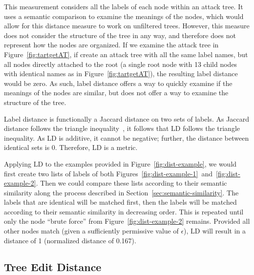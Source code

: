 This measurement considers all the labels of each node within an attack tree. It uses a semantic comparison to examine the meanings of the nodes, which would allow for this distance measure to work on unfiltered trees. However, this measure does not consider the structure of the tree in any way, and therefore does not represent how the nodes are organized. If we examine the attack tree in Figure~\ref{fig:tartgetAT}, if create an attack tree with all the same label names, but all nodes directly attached to the root (a single root node with 13 child nodes with identical names as in Figure~\ref{fig:tartgetAT}), the resulting label distance would be zero. As such, label distance offers a way to quickly examine if the meanings of the nodes are similar, but does not offer a way to examine the structure of the tree. 

Label distance is functionally a Jaccard distance on two sets of labels. As Jaccard distance follows the triangle inequality~\cite{kosub2019note}, it follows that LD follows the triangle inequality. As LD is additive, it cannot be negative; further, the distance between identical sets is 0. Therefore, LD is a metric.


Applying LD to the examples provided in Figure~\ref{fig:dist-example}, we would first create two lists of labels of both Figures~\ref{fig:dist-example-1}~and~\ref{fig:dist-example-2}. Then we could compare these lists according to their semantic similarity along the process described in Section~\ref{sec:semantic-similarity}. The labels that are identical will be matched first, then the labels will be matched according to their semantic similarity in decreasing order. This is repeated until only the node ``brute force'' from Figure~\ref{fig:dist-example-2} remains. Provided all other nodes match (given a sufficiently permissive value of $\epsilon$), LD will result in a distance of 1 (normalized distance of 0.167).



\subsection{Tree Edit Distance}
\label{ssec:ted}

